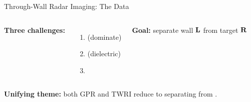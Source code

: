 \begin{frame}{Through-Wall Radar Imaging: The Data}
  \begin{columns}[T]
      \vspace{0.3em}
      \centering

      \vspace{0.3em}
      \textbf{Three challenges:}
      \begin{enumerate}
        \setlength{\itemsep}{0.1em}
        \item {} (dominate)
        \item {} (dielectric)
        \item {}
      \end{enumerate}

      \vspace{0.6em}
      \begin{shibiunote}
        \textbf{Goal:} separate wall $\mathbf{L}$
        from target $\mathbf{R}$
      \end{shibiunote}
  \end{columns}

  \vspace{0.4em}
  \begin{shibuiwarning}
    \textbf{Unifying theme:} both GPR and TWRI reduce to separating
     from .
  \end{shibuiwarning}
\end{frame}
